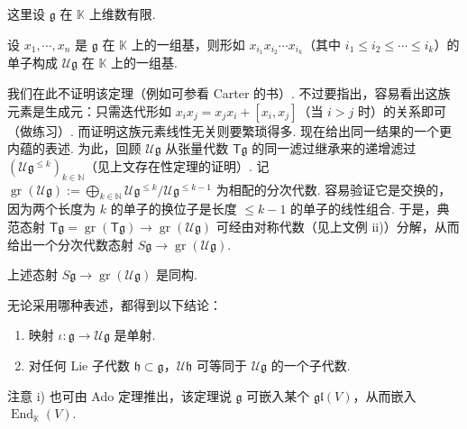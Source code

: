 \begin{numpara}\label{np:lie-2-1-3}
这里设 $\mathfrak g$ 在 $\mathbb K$ 上维数有限.
\begin{theorem*}[第一种表述]
设 $x_1,\cdots,x_n$ 是 $\mathfrak g$ 在 $\mathbb K$ 上的一组基，则形如 $x_{i_1}x_{i_2}\cdots x_{i_k}$（其中 $i_1\le i_2\le\cdots\le i_k$）的单子构成 $\mathcal U\mathfrak g$ 在 $\mathbb K$ 上的一组基.
\end{theorem*}
我们在此不证明该定理（例如可参看 Carter 的书）. 不过要指出，容易看出这族元素是生成元：只需迭代形如 $x_ix_j=x_jx_i+[x_i,x_j]$（当 $i>j$ 时）的关系即可（做练习）. 而证明这族元素线性无关则要繁琐得多.
现在给出同一结果的一个更内蕴的表述. 为此，回顾 $\mathcal U\mathfrak g$ 从张量代数 $\mathsf T\mathfrak g$ 的同一滤过继承来的递增滤过 $(\mathcal U\mathfrak g^{\le k})_{k\in\mathbb N}$（见上文存在性定理的证明）. 记 $\operatorname{gr}(\mathcal U\mathfrak g):=\bigoplus_{k\in\mathbb N}\mathcal U\mathfrak g^{\le k}/\mathcal U\mathfrak g^{\le k-1}$ 为相配的分次代数. 容易验证它是交换的，因为两个长度为 $k$ 的单子的换位子是长度 $\le k-1$ 的单子的线性组合. 于是，典范态射 $\mathsf T\mathfrak g=\operatorname{gr}(\mathsf T\mathfrak g)\longrightarrow\operatorname{gr}(\mathcal U\mathfrak g)$ 可经由对称代数（见上文例 ii)）分解，从而给出一个分次代数态射 $S\mathfrak g\longrightarrow\operatorname{gr}(\mathcal U\mathfrak g)$.
\begin{theorem*}[第二种表述]
上述态射 $S\mathfrak g\longrightarrow\operatorname{gr}(\mathcal U\mathfrak g)$ 是同构.
\end{theorem*}
无论采用哪种表述，都得到以下结论：
\begin{corollary*}
\begin{enumerate}[label=\roman*)]
\item 映射 $\iota:\mathfrak g\longrightarrow\mathcal U\mathfrak g$ 是单射.
\item 对任何 Lie 子代数 $\mathfrak h\subset\mathfrak g$，$\mathcal U\mathfrak h$ 可等同于 $\mathcal U\mathfrak g$ 的一个子代数.
\end{enumerate}
\end{corollary*}
注意 i) 也可由 Ado 定理推出，该定理说 $\mathfrak g$ 可嵌入某个 $\mathfrak{gl}(V)$，从而嵌入 $\operatorname{End}_{\mathbb K}(V)$.
\end{numpara}

